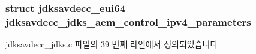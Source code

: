 \subsubsection[{\texorpdfstring{jdksavdecc\+\_\+jdks\+\_\+aem\+\_\+control\+\_\+ipv4\+\_\+parameters}{jdksavdecc_jdks_aem_control_ipv4_parameters}}]{\setlength{\rightskip}{0pt plus 5cm}struct {\bf jdksavdecc\+\_\+eui64} jdksavdecc\+\_\+jdks\+\_\+aem\+\_\+control\+\_\+ipv4\+\_\+parameters}\hypertarget{group__jdks__ipv4_ga9e6a9013bc2267291e241cb6c5b2cf00}{}\label{group__jdks__ipv4_ga9e6a9013bc2267291e241cb6c5b2cf00}


jdksavdecc\+\_\+jdks.\+c 파일의 39 번째 라인에서 정의되었습니다.

